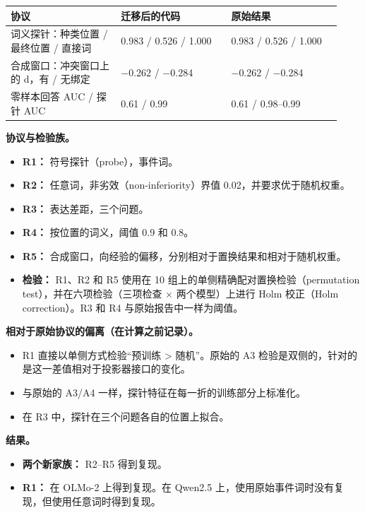 \documentclass[UTF8,fontset=none,a4paper]{ctexart}
\begin{document}
\begin{center}\small\begin{tabular}{p{0.31\linewidth} p{0.31\linewidth} p{0.31\linewidth}}\hline
\textbf{协议} & \textbf{迁移后的代码} & \textbf{原始结果} \\ \hline
词义探针：种类位置 / 最终位置 / 直接词 & 0.983 / 0.526 / 1.000 & 0.983 / 0.526 / 1.000 \\
合成窗口：冲突窗口上的 d，有 / 无绑定 & $-$0.262 / $-$0.284 & $-$0.262 / $-$0.284 \\
零样本回答 AUC / 探针 AUC & 0.61 / 0.99 & 0.61 / \mbox{0.98--0.99} \\
\hline\end{tabular}\end{center}

\textbf{协议与检验族。}
\begin{itemize}
\item \textbf{R1：} 符号探针（probe），事件词。
\item \textbf{R2：} 任意词，非劣效（\mbox{non-inferiority}）界值 0.02，并要求优于随机权重。
\item \textbf{R3：} 表达差距，三个问题。
\item \textbf{R4：} 按位置的词义，阈值 0.9 和 0.8。
\item \textbf{R5：} 合成窗口，向经验的偏移，分别相对于置换结果和相对于随机权重。
\item \textbf{检验：} R1、R2 和 R5 使用在 10 组上的单侧精确配对置换检验（permutation test），并在六项检验（三项检查 $\times$ 两个模型）上进行 Holm 校正（Holm correction）。R3 和 R4 与原始报告中一样为阈值。
\end{itemize}

\textbf{相对于原始协议的偏离（在计算之前记录）。}
\begin{itemize}
\item R1 直接以单侧方式检验``预训练 > 随机''。原始的 A3 检验是双侧的，针对的是这一差值相对于投影器接口的变化。
\item 与原始的 A3/A4 一样，探针特征在每一折的训练部分上标准化。
\item 在 R3 中，探针在三个问题各自的位置上拟合。
\end{itemize}

\textbf{结果。}
\begin{itemize}
\item \textbf{两个新家族：} \mbox{R2--R5} 得到复现。
\item \textbf{R1：} 在 \mbox{OLMo-2} 上得到复现。在 Qwen2.5 上，使用原始事件词时没有复现，但使用任意词时得到复现。
\end{itemize}
\end{document}
